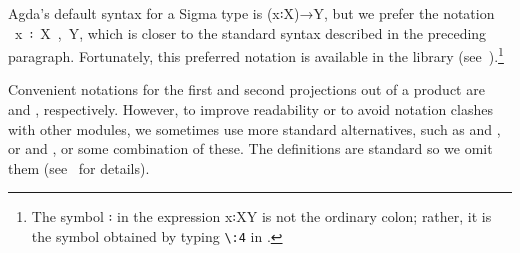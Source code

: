 Agda's default syntax for a Sigma type is (\ab x꞉\ab X)\as →\ab Y, but we prefer the notation ~\ab x~꞉~\ab X~,~\ab Y, which is closer to the standard syntax described in the preceding paragraph. Fortunately, this preferred notation is available in the \typetopology library (see~\cite[Σ types]{MHE}).\footnote{The symbol \as ꞉ in the expression \ab x\as ꞉\ab X\AgdaComma{}\ab Y is not the ordinary colon; rather, it is the symbol obtained by typing \texttt{\textbackslash{}:4} in \agdatwomode.} 

\newcommand\FstUnder{\AgdaOperator{\AgdaFunction{∣\AgdaUnderscore{}∣}}\xspace}
\newcommand\SndUnder{\AgdaOperator{\AgdaFunction{∥\AgdaUnderscore{}∥}}\xspace}
Convenient notations for the first and second projections out of a product are \FstUnder and \SndUnder, respectively. However, to improve readability or to avoid notation clashes with other modules, we sometimes use more standard alternatives, such as  and , or  and , or some combination of these. The definitions are standard so we omit them (see~\cite{DeMeo:2021} for details).

